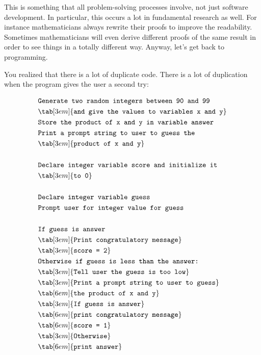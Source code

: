 This is something that all problem-solving processes involve, not just
software development. In particular, this occurs a lot in fundamental
research as well. For instance mathematicians always rewrite their
proofs to improve the readability. Sometimes mathematicians will even
derive different proofs of the same result in order to see things in a
totally different way. Anyway, let's get back to
programming.

You realized that there is a lot of duplicate code. There is a lot of
duplication when the program gives the user a second try:

\begin{align*}
&\texttt{Generate two random integers between 90 and 99}\\
&\tab[3em]{\texttt{and give the values to variables x and y}}\\
&\texttt{Store the product of x and y in variable answer}\\
&\texttt{Print a prompt string to user to guess the}\\
&\tab[3em]{\texttt{product of x and y}}\\\\
&\texttt{Declare integer variable score and initialize it}\\
&\tab[3em]{\texttt{to 0}}\\\\
&\texttt{Declare integer variable guess}\\
&\texttt{Prompt user for integer value for guess}\\\\
&\texttt{If guess is answer}\\
&\tab[3em]{\texttt{Print congratulatory message}}\\
&\tab[3em]{\texttt{score = 2}}\\
&\texttt{Otherwise if guess is less than the answer:}\\
&\tab[3em]{\texttt{Tell user the guess is too low}}\\
&\tab[3em]{\texttt{Print a prompt string to user to guess}}\\
&\tab[6em]{\texttt{the product of x and y}}\\
&\tab[3em]{\texttt{If guess is answer}}\\
&\tab[6em]{\texttt{print congratulatory message}}\\
&\tab[6em]{\texttt{score = 1}}\\
&\tab[3em]{\texttt{Otherwise}}\\
&\tab[6em]{\texttt{print answer}}\\

\end{align*}
